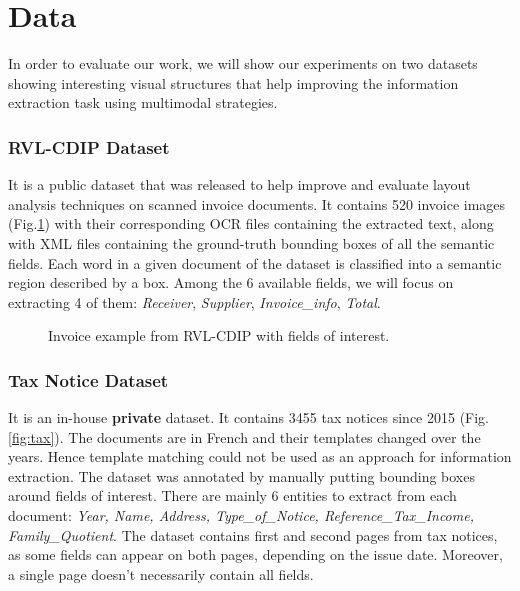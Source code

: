 \documentclass[runningheads]{llncs}
\begin{document}
\section{Data}

In order to evaluate our work, we will show our experiments on two datasets showing interesting visual structures that help improving the information extraction task using multimodal strategies.

\subsubsection{\textbf{RVL-CDIP Dataset \cite{rvl}}} 
It is a public dataset that was released to help improve and evaluate layout analysis techniques on scanned invoice documents. It contains 520 invoice images (Fig.\ref{fig:rvl-cdip}) with their corresponding OCR files containing the extracted text, along with  XML files containing the ground-truth bounding boxes of all the semantic fields. Each word in a given document of the dataset is classified into a semantic region described by a box. Among the 6 available fields, we will focus on extracting 4 of them: \textit{Receiver}, \textit{Supplier}, \textit{Invoice\_info}, \textit{Total}.
\newline

\begin{figure}[!h]
\begin{minipage}[t]{0.5\linewidth}
    \centering
    {\setlength{\fboxsep}{0pt}\setlength{\fboxrule}{1pt}}
    \label{f31}
\end{minipage}
\hspace{0.1cm}
\begin{minipage}[t]{0.5\linewidth} 
    \centering
    {\setlength{\fboxsep}{0pt}\setlength{\fboxrule}{1pt}}\label{f32}
\end{minipage}        
    \caption{Invoice example from RVL-CDIP with fields of interest.}
\label{fig:rvl-cdip}
\end{figure}  




\subsubsection{\textbf{Tax Notice Dataset}}
It is an in-house \textbf{private} dataset. It contains 3455 tax notices since 2015 (Fig.\ref{fig:tax}). The documents are in French and their templates changed over the years. 
Hence template matching could not be used as an approach for information extraction. The dataset was annotated by manually putting bounding boxes around fields of interest. There are mainly 6 entities to extract from each document: \textit{Year, Name, Address, Type\_of\_Notice, Reference\_Tax\_Income, Family\_Quotient}.
The dataset contains first and second pages from tax notices, as some fields can appear on both pages, depending on the issue date. Moreover, a single page doesn't necessarily contain all fields.  
\end{document}
